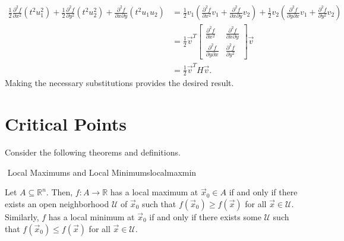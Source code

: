     \begin{align*}
        \frac{1}{2}\frac{\partial^2 f}{\partial x^2}(t^2u_1^2)+\frac{1}{2}\frac{\partial^2 f}{\partial y^2}(t^2u_2^2)+\frac{\partial^2f}{\partial x\partial y}(t^2u_1u_2)&=\frac{1}{2}v_1\left(\frac{\partial^2f}{\partial x^2}v_1+\frac{\partial^2f}{\partial x\partial y}v_2\right)+\frac{1}{2}v_2\left(\frac{\partial^2f}{\partial y\partial x}v_1+\frac{\partial^2f}{\partial y^2}v_2\right) \\
        &=\frac{1}{2}\vec{v}^T\begin{bmatrix} \frac{\partial^2f}{\partial x^2} & \frac{\partial^2f}{\partial x\partial y} \\ \frac{\partial^2f}{\partial y\partial x} & \frac{\partial^2f}{\partial y^2} \end{bmatrix}\vec{v} \\
        &=\frac{1}{2}\vec{v}^TH\vec{v}.
    \end{align*}
    Making the necessary substitutions provides the desired result.

\pagebreak

\section{Critical Points}

    Consider the following theorems and definitions.
    \begin{definition}{\Stop\,\,Local Maximums and Local Minimums}{localmaxmin}

        Let \(A\subseteq\mathbb{R}^n\). Then, \(f:A\to\mathbb{R}\) has a local maximum at \(\vec{x}_0\in A\) if and only if there exists an open neighborhood \(\mathcal{U}\) of \(\vec{x}_0\) such that \(f(\vec{x}_0)\geq f(\vec{x})\) for all \(\vec{x}\in\mathcal{U}\). Similarly, \(f\) has a local minimum at \(\vec{x}_0\) if and only if there exists some \(\mathcal{U}\) such that \(f(\vec{x}_0)\leq f(\vec{x})\) for all \(\vec{x}\in\mathcal{U}\).
        
    \end{definition}